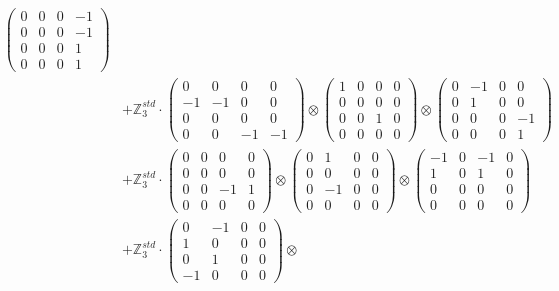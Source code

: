 \documentclass{article}
\begin{document}
{\begin{align}
            \begin{pmatrix} 0 & 0 & 0 & -1 \\ 0 & 0 & 0 & -1 \\ 0 & 0 & 0 & 1 \\ 0 & 0 & 0 & 1 \end{pmatrix} \\ 
        &+ \label{Rs1-Rc16-Solution-1-c15} \mathbb{Z}_3^{std} \cdot 
            \begin{pmatrix} 0 & 0 & 0 & 0 \\ -1 & -1 & 0 & 0 \\ 0 & 0 & 0 & 0 \\ 0 & 0 & -1 & -1 \end{pmatrix} \otimes 
            \begin{pmatrix} 1 & 0 & 0 & 0 \\ 0 & 0 & 0 & 0 \\ 0 & 0 & 1 & 0 \\ 0 & 0 & 0 & 0 \end{pmatrix} \otimes 
            \begin{pmatrix} 0 & -1 & 0 & 0 \\ 0 & 1 & 0 & 0 \\ 0 & 0 & 0 & -1 \\ 0 & 0 & 0 & 1 \end{pmatrix} \\ 
        &+ \label{Rs1-Rc16-Solution-1-c16} \mathbb{Z}_3^{std} \cdot 
            \begin{pmatrix} 0 & 0 & 0 & 0 \\ 0 & 0 & 0 & 0 \\ 0 & 0 & -1 & 1 \\ 0 & 0 & 0 & 0 \end{pmatrix} \otimes 
            \begin{pmatrix} 0 & 1 & 0 & 0 \\ 0 & 0 & 0 & 0 \\ 0 & -1 & 0 & 0 \\ 0 & 0 & 0 & 0 \end{pmatrix} \otimes 
            \begin{pmatrix} -1 & 0 & -1 & 0 \\ 1 & 0 & 1 & 0 \\ 0 & 0 & 0 & 0 \\ 0 & 0 & 0 & 0 \end{pmatrix} \\ 
        &+ \label{Rs1-Rc16-Solution-1-c17} \mathbb{Z}_3^{std} \cdot 
            \begin{pmatrix} 0 & -1 & 0 & 0 \\ 1 & 0 & 0 & 0 \\ 0 & 1 & 0 & 0 \\ -1 & 0 & 0 & 0 \end{pmatrix} \otimes 

\end{align}}
\end{document}
